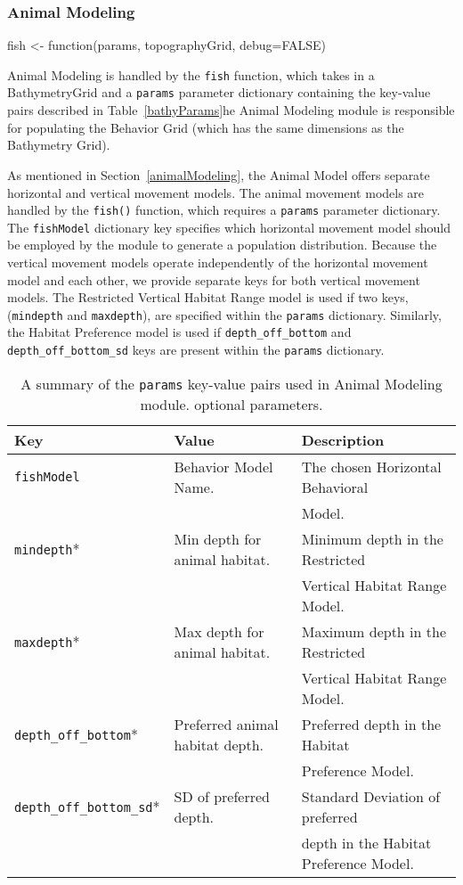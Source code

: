 \subsubsection{Animal Modeling}
fish <- function(params, topographyGrid, debug=FALSE)
	
Animal Modeling is handled by the \texttt{fish} function, which takes in a BathymetryGrid and a \texttt{params} parameter dictionary containing the key-value pairs described in Table~\ref{bathyParams}he Animal Modeling module is responsible for populating the Behavior Grid (which has the same dimensions as the Bathymetry Grid).  

As mentioned in Section~\ref{animalModeling}, the Animal Model offers separate horizontal and vertical movement models.  The animal movement models are handled by the \texttt{fish()} function, which requires a \texttt{params} parameter dictionary.  The \texttt{fishModel} dictionary key specifies which horizontal movement model should be employed by the module to generate a population distribution.  Because the vertical movement models operate independently of the horizontal movement model and each other, we provide separate keys for both vertical movement models.  The Restricted Vertical Habitat Range model is used if two keys, (\texttt{mindepth} and \texttt{maxdepth}), are specified within the \texttt{params} dictionary.  Similarly, the Habitat Preference model is used if \texttt{depth\_off\_bottom} and \texttt{depth\_off\_bottom\_sd} keys are present within the \texttt{params} dictionary.  

\begin{table}[ht]
	\begin{tabular}{l l l}
		Key									&	Value 							&	Description\\
		\hline
		\texttt{fishModel}					& 	Behavior Model Name.			&	The chosen Horizontal Behavioral\\
					 						&									&    Model.\\
		\texttt{mindepth}*					& 	Min depth for animal habitat.	&	Minimum depth in the Restricted\\
					 						&									&   Vertical Habitat Range Model.\\
		\texttt{maxdepth}*					& 	Max depth for animal habitat.	&	Maximum depth in the Restricted\\
					 						&									&   Vertical Habitat Range Model.\\
		\texttt{depth\_off\_bottom}*		& 	Preferred animal habitat depth.	&   Preferred depth in the Habitat\\
					 						&									&   Preference Model.\\
		\texttt{depth\_off\_bottom\_sd}*	& 	SD of preferred depth.			&   Standard Deviation of preferred\\
					 						&									&   depth in the Habitat Preference Model.\\
	\end{tabular}
	\caption{A summary of the \texttt{params} key-value pairs used in Animal Modeling module.  \newline * optional parameters.
		\label{animalParams}}
\end{table}

